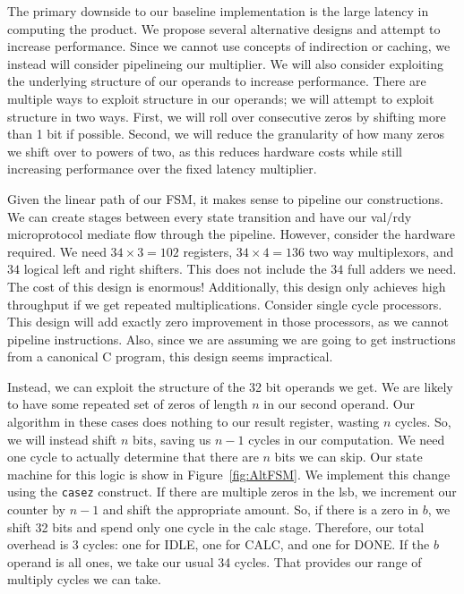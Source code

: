 \documentclass[11pt]{article}
\begin{document}
The primary downside to our baseline implementation is the large latency in computing the product.
We propose several alternative designs and attempt to increase performance.
Since we cannot use concepts of indirection or caching, we instead will consider pipelineing our multiplier.
We will also consider exploiting the underlying structure of our operands to increase performance.
There are multiple ways to exploit structure in our operands; we will attempt to exploit structure in two ways.
First, we will roll over consecutive zeros by shifting more than 1 bit if possible.
Second, we will reduce the granularity of how many zeros we shift over to powers of two, as this reduces hardware costs
while still increasing performance over the fixed latency multiplier.

Given the linear path of our FSM, it makes sense to pipeline our constructions.
We can create stages between every state transition and have our val/rdy microprotocol mediate flow through the pipeline.
However, consider the hardware required. We need $34 \times 3 = 102$ registers, $34 \times 4 = 136$ two way multiplexors,
and $34$ logical left and right shifters.
This does not include the $34$ full adders we need. 
The cost of this design is enormous!
Additionally, this design only achieves high throughput if we get repeated multiplications.
Consider single cycle processors.
This design will add exactly zero improvement in those processors, as we cannot pipeline instructions. 
Also, since we are assuming we are going to get instructions from a canonical C program, this design seems impractical.

Instead, we can exploit the structure of the 32 bit operands we get.
We are likely to have some repeated set of zeros of length $n$ in our second operand.
Our algorithm in these cases does nothing to our result register, wasting $n$ cycles.
So, we will instead shift $n$ bits, saving us $n-1$ cycles in our computation.
We need one cycle to actually determine that there are $n$ bits we can skip.
Our state machine for this logic is show in Figure~\ref{fig:AltFSM}.
We implement this change using the \verb+casez+ construct.
If there are multiple zeros in the lsb, we increment our counter by $n-1$ and shift the appropriate amount.
So, if there is a zero in $b$, we shift 32 bits and spend only one cycle in the calc stage.
Therefore, our total overhead is 3 cycles: one for IDLE, one for CALC, and one for DONE.
If the $b$ operand is all ones, we take our usual 34 cycles.
That provides our range of multiply cycles we can take.
\end{document}
